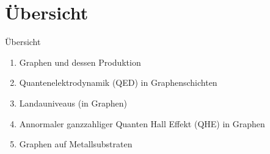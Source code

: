 \documentclass[../defence.tex]{subfiles}
\begin{document}
  \section{Übersicht}

  \begin{frame}{Übersicht}
      \begin{enumerate}
        \item Graphen und dessen Produktion
        \item Quantenelektrodynamik (QED) in Graphenschichten
        \item Landauniveaus (in Graphen)
        \item Annormaler ganzzahliger Quanten Hall Effekt (QHE) in Graphen
        \item Graphen auf Metallsubstraten
      \end{enumerate}
  \end{frame}
\end{document}
